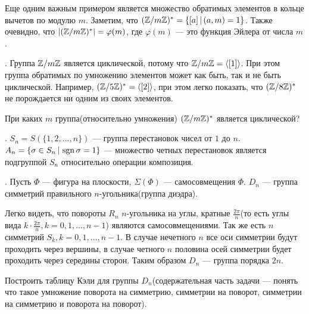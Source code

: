 \documentclass[../main.tex]{subfiles}
\begin{document}
Еще одним важным примером является множество обратимых элементов в кольце вычетов по модулю $m$. Заметим, что $(\mathbb{Z}/m\mathbb{Z})^{*} = \{[a] \, | \, (a, m) = 1\}$. Также очевидно, что $|(\mathbb{Z}/m\mathbb{Z})^{*}| = \varphi(m)$, где $\varphi(m)$ --- это функция Эйлера от числа $m$.

. Группа $\mathbb{Z}/m\mathbb{Z}$ является циклической, потому что $\mathbb{Z}/m\mathbb{Z} = \langle[1]\rangle$. При этом группа обратимых по умножению элементов может как быть, так и не быть циклической. Например, $(\mathbb{Z}/5\mathbb{Z})^{*} = \langle[2]\rangle$, при этом легко показать, что $(\mathbb{Z}/8\mathbb{Z})^{*}$ не порождается ни одним из своих элементов.

\begin{exercise}
    При каких $m$ группа(относительно умножения) $(\mathbb{Z}/m\mathbb{Z})^{*}$ является циклической?
\end{exercise}

\textbf{}. $S_n = S(\{1, 2, \dotsc, n\})$ --- группа перестановок чисел от $1$ до $n$. $A_n = \{\sigma \in S_n \, | \, \operatorname{sgn} \sigma = 1\}$ --- множество четных перестановок является подгруппой $S_n$ относительно операции композиция.

\textbf{}. Пусть $\Phi$ --- фигура на плоскости, $\Sigma(\Phi)$ --- самосовмещения $\Phi$. $D_n$ --- группа симметрий правильного $n$-угольника(группа диэдра).

\begin{center}
\end{center}
Легко видеть, что повороты $R_n$ $n$-угольника на углы, кратные $\frac{2\pi}{n}$(то есть углы вида $k \cdot \frac{2\pi}{n}, k = 0, 1, \dotsc, n - 1$) являются самосовмещениями. Так же есть $n$ симметрий $S_k, k = 0, 1, \dotsc, n - 1$. В случае нечетного $n$ все оси симметрии будут проходить через вершины, в случае четного $n$ половина осей симметрии будет проходить через середины сторон. Таким образом $D_n$ --- группа порядка $2n$.
\begin{exercise}
    Построить таблицу Кэли для группы $D_n$(содержательная часть задачи --- понять что такое умножение поворота на симметрию, симметрии на поворот, симметрии на симметрию и поворота на поворот).
\end{exercise}
\end{document}
